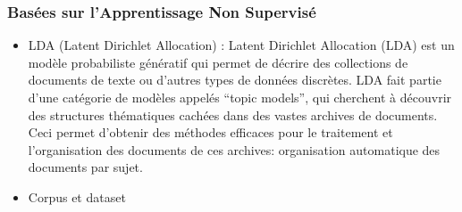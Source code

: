     \subsubsection{Basées sur l'Apprentissage Non Supervisé}
        
        \begin{itemize}
            \item{LDA (Latent Dirichlet Allocation) : }
            Latent Dirichlet Allocation (LDA) est un modèle probabiliste génératif qui permet de décrire des collections de documents de texte ou d’autres types de données discrètes. LDA fait partie d’une catégorie de modèles appelés “topic models”, qui cherchent à découvrir des structures thématiques cachées dans des vastes archives de documents. Ceci permet d’obtenir des méthodes efficaces pour le traitement et l’organisation des documents de ces archives: organisation automatique des documents par sujet.
        \end{itemize}
        
        \begin{itemize}
            \item{Corpus et dataset}
        \end{itemize}
        
